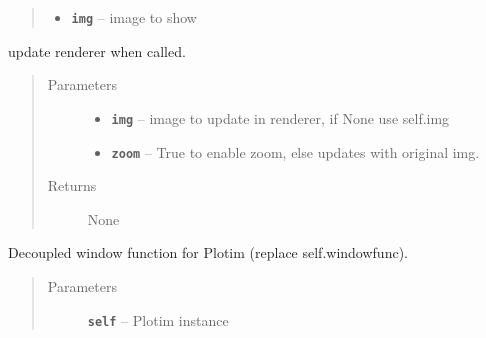\documentclass[letterpaper,10pt,english]{sphinxmanual}
\begin{document}
\begin{fulllineitems}
\begin{fulllineitems}
\begin{quote}
\begin{description}
\begin{itemize}
\item {} 
\textbf{\texttt{img}} -- image to show

\end{itemize}

\end{description}\end{quote}

\end{fulllineitems}


\begin{fulllineitems}
\label{RRtoolbox.lib:RRtoolbox.lib.plotter.Plotim.textbackground}
\end{fulllineitems}


\begin{fulllineitems}
\label{RRtoolbox.lib:RRtoolbox.lib.plotter.Plotim.updaterenderer}
update renderer when called.
\begin{quote}\begin{description}
\item[{Parameters}] \leavevmode\begin{itemize}
\item {} 
\textbf{\texttt{img}} -- image to update in renderer, if None use self.img

\item {} 
\textbf{\texttt{zoom}} -- True to enable zoom, else updates with original img.

\end{itemize}

\item[{Returns}] \leavevmode
None

\end{description}\end{quote}

\end{fulllineitems}


\begin{fulllineitems}
\label{RRtoolbox.lib:RRtoolbox.lib.plotter.Plotim.windowfunc}
Decoupled window function for Plotim (replace self.windowfunc).
\begin{quote}\begin{description}
\item[{Parameters}] \leavevmode
\textbf{\texttt{self}} -- Plotim instance

\end{description}\end{quote}

\end{fulllineitems}


\end{fulllineitems}
\end{document}

